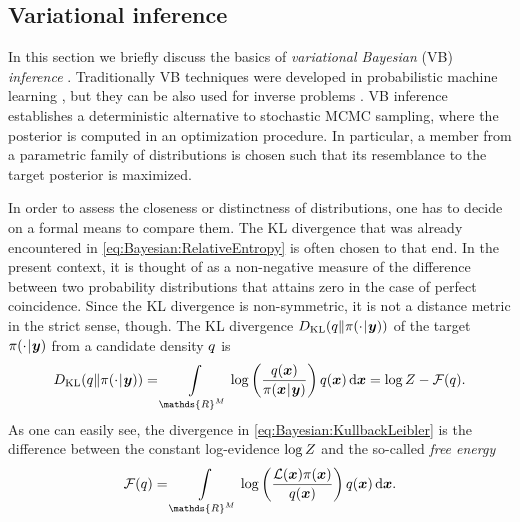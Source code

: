 \subsection{Variational inference} \label{sec:Bayesian:BayesianComputations:Variational}
In this section we briefly discuss the basics of \emph{variational Bayesian} (VB) \emph{inference} \cite{Bayesian:Smidl2006}.
Traditionally VB techniques were developed in probabilistic machine learning \cite{Bayesian:Wainwright2008},
but they can be also used for inverse problems \cite{Bayesian:Jin2012,Bayesian:Guha2015,Bayesian:Franck2016,Bayesian:Franck2017}.
VB inference establishes a deterministic alternative to stochastic MCMC sampling, where the posterior is computed in an optimization procedure.
In particular, a member from a parametric family of distributions is chosen such that its resemblance to the target posterior is maximized.
\par %
In order to assess the closeness or distinctness of distributions, one has to decide on a formal means to compare them.
The KL divergence that was already encountered in \cref{eq:Bayesian:RelativeEntropy} is often chosen to that end.
In the present context, it is thought of as a non-negative measure of the difference between two probability distributions that attains zero in the case of perfect coincidence.
Since the KL divergence is non-symmetric, it is not a distance metric in the strict sense, though.
The KL divergence \(D_{\mathrm{KL}}(q \| \pi(\cdot {\:\!}|{\:\!} \bm{y}))\) of the target \(\pi(\cdot {\:\!}|{\:\!} \bm{y})\) from a candidate density \(q\) is
\begin{equation} \label{eq:Bayesian:KullbackLeibler}
  D_{\mathrm{KL}}(\varapprox \| \pi(\cdot \cond \bm{y}))
  = \int\limits_{\mathds{R}^\dimParam} \log \left( \frac{\varapprox(\bm{x})}{\pi(\bm{x} \cond \bm{y})} \right) \varapprox(\bm{x}) \, \mathrm{d} \bm{x}
  = \log \scale - \mathcal{F}(\varapprox).
\end{equation}
As one can easily see, the divergence in \cref{eq:Bayesian:KullbackLeibler} is the difference between the constant log-evidence \(\log Z\) and the so-called \emph{free energy}
\begin{equation} \label{eq:Bayesian:FreeEnergy}
  \mathcal{F}(\varapprox)
  = \int\limits_{\mathds{R}^\dimParam} \log \left( \frac{\mathcal{L}(\bm{x}) \pi(\bm{x})}{\varapprox(\bm{x})} \right) \varapprox(\bm{x}) \, \mathrm{d} \bm{x}.
\end{equation}
\par %
